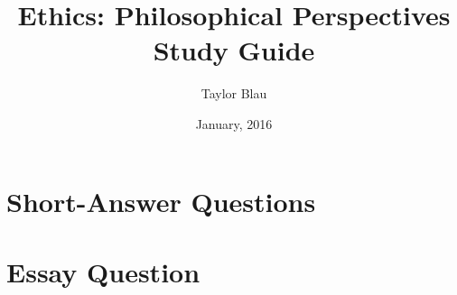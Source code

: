 \documentclass[12pt,letterpaper,titlepage]{book}
\title{Ethics: Philosophical Perspectives\\Study Guide}
\author{Taylor Blau}
\date{January, 2016}
\begin{document}
\maketitle
\tableofcontents

\chapter{Short-Answer Questions}






\chapter{Essay Question}
% 
\end{document}
